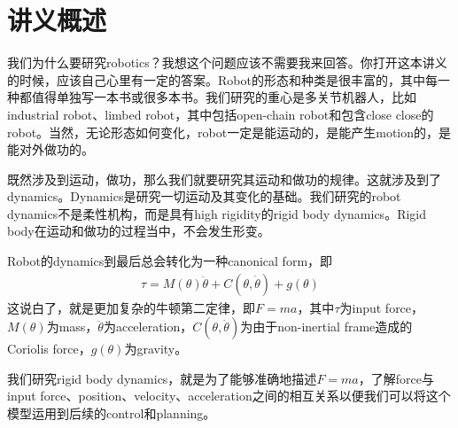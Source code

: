\documentclass[12pt, a4paper, article, UTF8]{ctexart}
\begin{document}
\section{讲义概述}
我们为什么要研究robotics？我想这个问题应该不需要我来回答。你打开这本讲义的时候，应该自己心里有一定的答案。Robot的形态和种类是很丰富的，其中每一种都值得单独写一本书或很多本书。我们研究的重心是多关节机器人，比如industrial robot、limbed robot，其中包括open-chain robot和包含close close的robot。当然，无论形态如何变化，robot一定是能运动的，是能产生motion的，是能对外做功的。

既然涉及到运动，做功，那么我们就要研究其运动和做功的规律。这就涉及到了dynamics。Dynamics是研究一切运动及其变化的基础。我们研究的robot dynamics不是柔性机构，而是具有high rigidity的rigid body dynamics。Rigid body在运动和做功的过程当中，不会发生形变。

Robot的dynamics到最后总会转化为一种canonical form，即
\begin{align}
\tau = M(\theta)\ddot{\theta} + C(\theta,\dot{\theta})+g(\theta) \label{eq:canonicaldynamics}
\end{align}
这说白了，就是更加复杂的牛顿第二定律，即$F=ma$，其中$\tau$为input force，$M(\theta)$为mass，$\ddot{\theta}$为acceleration，$C(\theta,\dot{\theta})$为由于non-inertial frame造成的Coriolis force，$g(\theta)$为gravity。

我们研究rigid body dynamics，就是为了能够准确地描述$F=ma$，了解force与input force、position、velocity、acceleration之间的相互关系以便我们可以将这个模型运用到后续的control和planning。
\end{document}
